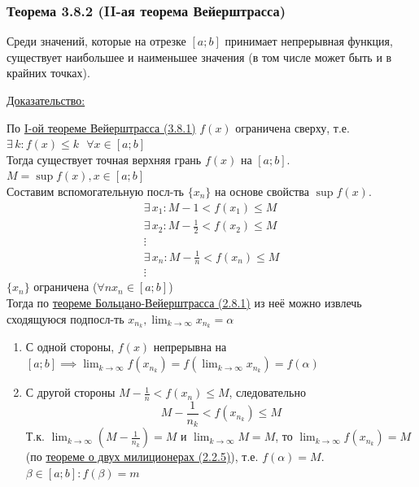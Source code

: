 \documentclass[12pt]{article}
\def\posl#1#2{\{#1_{#2}\}}
\begin{document}
    \subsubsection*{Теорема 3.8.2 (II-ая теорема Вейерштрасса)}\label{th:3.8.2}
    Среди значений, которые на отрезке $[a; b]$ принимает непрерывная функция, существует наибольшее и наименьшее значения (в том числе может быть и в крайних точках).\par\noindent
    \underline{Доказательство:}
    \begin{adjustwidth}{1.5em}{1.5em}
        По \hyperref[th:3.8.1]{I-ой теореме Вейерштрасса (3.8.1)} $f(x)$ ограничена сверху, т.е. $\exists\,k : f(x) \le k \text{ }  \forall x \in [a; b]$\\
        Тогда существует точная верхняя грань $f(x)$ на $[a; b]$. $M = \sup f(x), x \in [a; b]$\\
        Составим вспомогательную посл-ть $\posl{x}{n}$ на основе свойства $\sup f(x)$.
        \begin{gather*}
            \exists\,x_1 : M - 1 < f(x_1) \le M\\
            \exists\,x_2 : M - \frac{1}{2} < f(x_2) \le M\\
            \vdots\\
            \exists\,x_n : M - \frac{1}{n} < f(x_n) \le M\\
            \vdots
        \end{gather*}
        $\posl{x}{n}$ ограничена ($\forall n x_n \in [a; b]$)\\
        Тогда по \hyperref[th:2.8.1]{теореме Больцано-Вейерштрасса (2.8.1)} из неё можно извлечь сходящуюся подпосл-ть $x_{n_k}, \lim_{k\to\infty}x_{n_k} = \alpha$
        \begin{enumerate}
            \item С одной стороны, $f(x)$ непрерывна на $[a; b] \implies \lim_{k\to\infty}f(x_{n_k}) = f(\lim_{k\to\infty}x_{n_k}) = f(\alpha)$
            \item С другой стороны $M - \frac{1}{n} < f(x_n) \le M$, следовательно
            \[
                M - \frac{1}{n_k} < f(x_{n_k}) \le M
            \]
            Т.к. $\lim_{k\to\infty} (M - \frac{1}{n_k}) = M$ и $\lim_{k\to\infty} M = M$, то $\lim_{k\to\infty}f(x_{n_k}) = M$ (по \hyperref[th:2.2.5]{теореме о двух милиционерах (2.2.5)}), т.е. $f(\alpha) = M$.\\
            $\beta \in [a; b] : f(\beta) = m$
        \end{enumerate}
    \end{adjustwidth}
\end{document}
